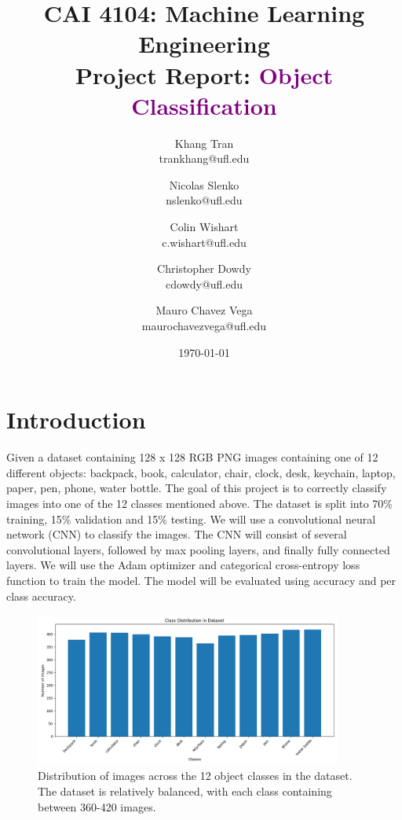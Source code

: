 \documentclass[10pt]{article}
\title{CAI 4104: Machine Learning Engineering\\
	\large Project Report:  {\textcolor{purple}{Object Classification}}} %
\author{
        Khang Tran \\
        trankhang@ufl.edu\\
        \and
        Nicolas Slenko \\
        nslenko@ufl.edu\\
        \and
        Colin Wishart \\
        c.wishart@ufl.edu\\
        \and
        Christopher Dowdy \\
        cdowdy@ufl.edu\\
        \and
        Mauro Chavez Vega \\
        maurochavezvega@ufl.edu\\
}
\date{\today}
\begin{document}

\maketitle






\section{Introduction}

Given a dataset containing 128 x 128 RGB PNG images containing one of 12 different objects: backpack, book, calculator, chair, clock, desk, keychain, laptop, paper, pen, phone, water bottle. The
goal of this project is to correctly classify images into one of the 12 classes mentioned above. The dataset is split into 70\% training, 15\% validation and 15\% testing. We will use a 
convolutional neural network (CNN) to classify the images. The CNN will consist of several convolutional layers, followed by max pooling layers, and finally fully connected layers. 
We will use the Adam optimizer and categorical cross-entropy loss function to train the model. The model will be evaluated using accuracy and per class accuracy.

\begin{figure}[H]
    \centering
    \includegraphics[width=0.9\textwidth]{figures/class_distribution.png}
    \caption{Distribution of images across the 12 object classes in the dataset. The dataset is relatively balanced, with each class containing between 360-420 images.}
    \label{fig:class_distribution}
\end{figure}
\end{document}
